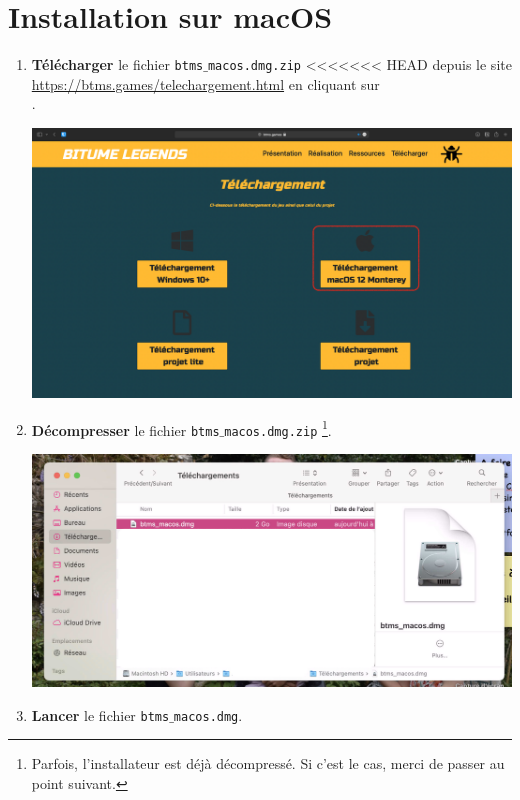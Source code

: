 \documentclass[a4paper,12pt]{article}
\begin{document}
    \section{Installation sur macOS}
        \begin{enumerate}
            \item
                \textbf{Télécharger} le fichier \texttt{btms$\_$macos.dmg.zip}
<<<<<<< HEAD
                depuis le site \\\url{https://btms.games/telechargement.html} en
                cliquant sur \\.\\
                \begin{center}
                    \includegraphics[scale=0.2]{dl_page_mac.png}
                \end{center}
            \item
                \textbf{Décompresser} le fichier \texttt{btms$\_$macos.dmg.zip}
                \footnote{Parfois, l'installateur est déjà décompressé. Si c'est
                le cas, merci de passer au point suivant.}.\\
                \begin{center}
                    \includegraphics[scale=0.4]{dmg_in_dl.png}
                \end{center}
            \item
                \textbf{Lancer} le fichier \texttt{btms$\_$macos.dmg}.
            

\end{enumerate}
\end{document}
